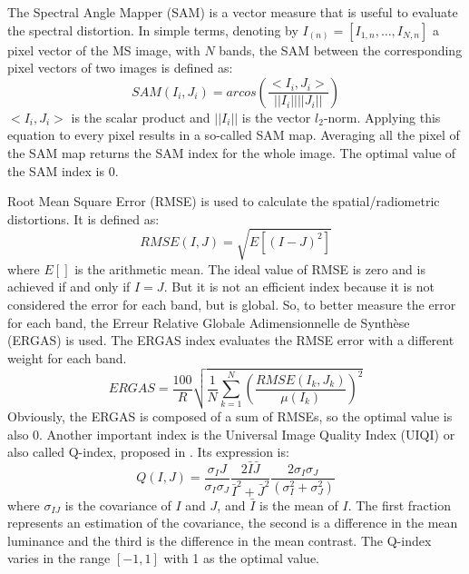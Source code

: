 \documentclass[12pt]{report}
\begin{document}
The Spectral Angle Mapper (SAM) is a vector measure that is useful to evaluate the spectral distortion.
In simple terms, denoting by $I_{(n)} = [I_{1,{n}}, \dots , I_{N,{n}}]$ a pixel vector of the MS image, with $N$ bands,
the SAM between the corresponding pixel vectors of two images is defined as:
%
\begin{equation}
    SAM(I_i, J_i) = arcos(\frac{<I_i, J_i>}{||I_i|| || J_i||})
    \label{sam}
\end{equation}
%
$<I_i, J_i>$ is the scalar product and $||I_i||$ is the vector $l_2$-norm. 
Applying this equation to every pixel results in a so-called SAM map.
Averaging all the pixel of the SAM map returns the SAM index for the whole image.
The optimal value of the SAM index is 0.

Root Mean Square Error (RMSE) is used to calculate the spatial/radiometric distortions.
It is defined as:
%
\begin{equation}
    RMSE(I,J) = \sqrt{E[(I-J)^2]}
    \label{rmse}
\end{equation}
%
where $E[]$ is the arithmetic mean.
The ideal value of RMSE is zero and is achieved if and only if $I = J$.
But it is not an efficient index because it is not considered the error for each band, but is global.
So, to better measure the error for each band, the Erreur Relative Globale
Adimensionnelle de Synthèse (ERGAS) is used. 
The ERGAS index evaluates the RMSE error with a different weight for each band.
%
\begin{equation}
    ERGAS = \frac{100}{R} \sqrt{\frac{1}{N} \sum_{k=1}^N\left(\frac{RMSE(I_k, J_k)}{\mu(I_k)}\right)^2}
    \label{ergas}
\end{equation}
%
Obviously, the ERGAS is composed of a sum of RMSEs, so the optimal value is also 0.
Another important index is the Universal Image Quality Index (UIQI) or also called Q-index, proposed in \cite{uiqi}.
Its expression is:
%
\begin{equation}
    Q(I,J) = \frac{\sigma_IJ}{\sigma_I \sigma_J} \frac{2 \bar{I}\bar{J}}{\bar{I}^2 + \bar{J}^2} 
    \frac{2 \sigma_I \sigma_J}{(\sigma_I^2 + \sigma_J^2)}
    \label{q}
\end{equation}
%
where $\sigma_{IJ}$ is the covariance of $I$ and $J$, and $\bar{I}$ is the mean of $I$.
The first fraction represents an estimation of the covariance, the second is a difference in the mean luminance
and the third is the difference in the mean contrast.
The Q-index varies in the range $[-1, 1]$ with 1 as the optimal value.
\end{document}
